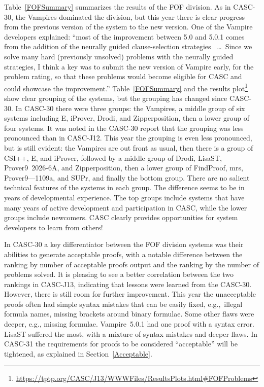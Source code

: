 \documentclass[aic]{iosart2x}
\newcommand{\smalltt}[1]{\small \texttt{#1}}
\newcommand{\LAST}{\mbox{CASC-30}}
\newcommand{\THIS}{\mbox{CASC-J13}}
\newcommand{\NEXT}{\mbox{CASC-31}}
\begin{document}
Table~\ref{FOFSummary} summarizes the results of the FOF division.
As in \LAST{}, the Vampires dominated the division, but this year there is clear progress
from the previous version of the system to the new version.
One of the Vampire developers explained: ``most of the improvement between 5.0 and 5.0.1 comes 
from the addition of the neurally guided clause-selection strategies~\cite{Sud25} \ldots~Since 
we solve many hard (previously unsolved) problems with the neurally guided strategies, I think 
a key was to submit the new version of Vampire early, for the problem rating, so that these 
problems would become eligible for CASC and could showcase the improvement.''
Table~\ref{FOFSummary} and the results plot\footnote{%
\url{https://tptp.org/CASC/J13/WWWFiles/ResultsPlots.html\#FOFProblems}} show clear grouping
of the systems, but the grouping has changed since \LAST{}.
In \LAST{} there were three groups: the Vampires, a middle group of six systems including E, 
iProver, Drodi, and Zipperposition, then a lower group of four systems.
It was noted in the \LAST{} report that the grouping was less pronounced than in CASC-J12.
This year the grouping is even less pronounced, but is still evident:
the Vampires are out front as usual, then there is a group of CSI++, E, and iProver,
followed by a middle group of Drodi, LisaST, Prover9~2026-6A, and Zipperposition, then a lower 
group of FindProof, mrs, Prover9---1109a, and SUPr, and finally the bottom group.
There are no salient technical features of the systems in each group. 
The difference seems to be in years of developmental experience.
The top groups include systems that have many years of active development and participation in 
CASC, while the lower groups include newcomers.
CASC clearly provides opportunities for system developers to learn from others!

In \LAST{} a key differentiator between the FOF division systems was their abilities to generate 
acceptable proofs, with a notable difference between the ranking by number of acceptable proofs 
output and the ranking by the number of problems solved.
It is pleasing to see a better correlation between the two rankings in \THIS{}, indicating that
lessons were learned from the \LAST{}.
However, there is still room for further improvement.
This year the unacceptable proofs often had simple syntax mistakes that can be easily fixed, 
e.g.,~illegal formula names, missing brackets around binary formulae.
Some other flaws were deeper, e.g., missing formulae.
Vampire~5.0.1 had one proof with a syntax error.
LisaST suffered the most, with a mixture of syntax mistakes and deeper flaws.
In \NEXT{} the requirements for proofs to be considered ``acceptable'' will be tightened, as 
explained in Section~\ref{Acceptable}.
\end{document}
